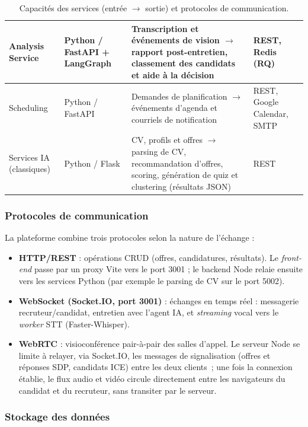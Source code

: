 \begin{table}[H]
\begin{tabularx}{\textwidth}{|>{\raggedright\arraybackslash}p{2.3cm}|>{\raggedright\arraybackslash}p{2.4cm}|>{\raggedright\arraybackslash}X|>{\raggedright\arraybackslash}p{2.2cm}|}
    \hline
    Analysis Service & Python / FastAPI + LangGraph & Transcription et événements de vision $\rightarrow$ rapport post-entretien, classement des candidats et aide à la décision & REST, Redis (RQ) \\
    \hline
    Scheduling & Python / FastAPI & Demandes de planification $\rightarrow$ événements d'agenda et courriels de notification & REST, Google Calendar, SMTP \\
    \hline
    Services IA (classiques) & Python / Flask & CV, profils et offres $\rightarrow$ parsing de CV, recommandation d'offres, scoring, génération de quiz et clustering (résultats JSON) & REST \\
    \hline
  \end{tabularx}
  \caption{Capacités des services (entrée $\rightarrow$ sortie) et protocoles de communication.}
  \label{tab:services}
\end{table}

\subsubsection{Protocoles de communication}

La plateforme combine trois protocoles selon la nature de l'échange :

\begin{itemize}
  \item \textbf{HTTP/REST} : opérations CRUD (offres, candidatures, résultats). Le
        \textit{front-end} passe par un proxy Vite vers le port 3001 ; le backend Node relaie
        ensuite vers les services Python (par exemple le parsing de CV sur le port 5002).
  \item \textbf{WebSocket (Socket.IO, port 3001)} : échanges en temps réel : messagerie
        recruteur/candidat, entretien avec l'agent IA, et \textit{streaming} vocal vers le
        \textit{worker} STT (Faster-Whisper).
  \item \textbf{WebRTC} : visioconférence pair-à-pair des salles d'appel. Le serveur Node
        se limite à relayer, via Socket.IO, les messages de signalisation (offres et
        réponses SDP, candidats ICE) entre les deux clients~; une fois la connexion établie,
        le flux audio et vidéo circule directement entre les navigateurs du candidat et du
        recruteur, sans transiter par le serveur.
\end{itemize}

\subsubsection{Stockage des données}

